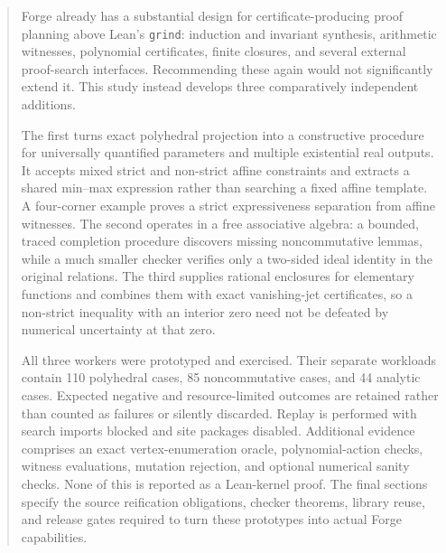 \documentclass[11pt,a4paper]{article}
\theoremstyle{definition}\newtheorem{definition}[theorem]{Definition}
\theoremstyle{remark}\newtheorem{remark}[theorem]{Remark}
\newcommand{\code}[1]{\texttt{#1}}
\newcommand{\grind}{\code{grind}}
\begin{document}
\begin{abstract}
Forge already has a substantial design for certificate-producing proof planning above Lean's \grind{}: induction and invariant synthesis, arithmetic witnesses, polynomial certificates, finite closures, and several external proof-search interfaces. Recommending these again would not significantly extend it. This study instead develops three comparatively independent additions.

The first turns exact polyhedral projection into a constructive procedure for universally quantified parameters and multiple existential real outputs. It accepts mixed strict and non-strict affine constraints and extracts a shared min--max expression rather than searching a fixed affine template. A four-corner example proves a strict expressiveness separation from affine witnesses. The second operates in a free associative algebra: a bounded, traced completion procedure discovers missing noncommutative lemmas, while a much smaller checker verifies only a two-sided ideal identity in the original relations. The third supplies rational enclosures for elementary functions and combines them with exact vanishing-jet certificates, so a non-strict inequality with an interior zero need not be defeated by numerical uncertainty at that zero.

All three workers were prototyped and exercised. Their separate workloads contain 110 polyhedral cases, 85 noncommutative cases, and 44 analytic cases. Expected negative and resource-limited outcomes are retained rather than counted as failures or silently discarded. Replay is performed with search imports blocked and site packages disabled. Additional evidence comprises an exact vertex-enumeration oracle, polynomial-action checks, witness evaluations, mutation rejection, and optional numerical sanity checks. None of this is reported as a Lean-kernel proof. The final sections specify the source reification obligations, checker theorems, library reuse, and release gates required to turn these prototypes into actual Forge capabilities.
\end{abstract}
{\small\setlength{\parskip}{0pt}\tableofcontents}
\clearpage







\appendix


\end{document}
